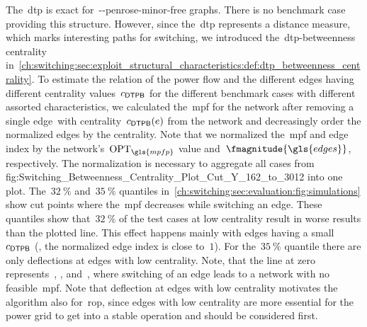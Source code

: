 The~\gls{dtp} is exact for~\source-\sink-penrose-minor-free graphs. There is no
benchmark case providing this structure. However, since the~\gls{dtp} represents
a distance measure, which marks interesting paths for switching, we introduced
the~\gls{dtp}-betweenness centrality
in~\cref{ch:switching:sec:exploit_structural_characteristics:def:dtp_betweenness_centrality}.
To estimate the relation of the power flow and the different edges having
different centrality values~$c_\mathsf{\mathsf{DTP} B}$ for the different benchmark cases with
different assorted characteristics, we calculated the~\gls{mpf} for the network
after removing a single edge~\edge with centrality~$c_\mathsf{\mathsf{DTP} B}(e)$ from the
network and decreasingly order the normalized edges by the centrality. Note that
we normalized the~\gls{mpf} and edge index by the network's~$\opt_{\gls{mpfp}}$
value and~$\fmagnitude{\gls{edges}}$, respectively. The normalization is
necessary to aggregate all cases
from~
{fig:Switching_Betweenness_Centrality_Plot_Cut_Y_162_to_3012} into one plot.
The~$32~\%$ and~$35~\%$ quantiles
in~\cref{ch:switching:sec:evaluation:fig:simulations} show cut points
where the~\gls{mpf} decreases while switching an edge. These quantiles show
that~$32~\%$ of the test cases at low centrality result in worse results than
the plotted line. This effect happens mainly with edges having a small~$c_\mathsf{\mathsf{DTP} B}$
(\ie, the normalized edge index is close to~$1$). For the~$35~\%$ quantile there
are only deflections at edges with low centrality. Note, that the line at zero
represents~, , and~, where
switching of an edge leads to a network with no feasible~\gls{mpf}. Note that
deflection at edges with low centrality motivates the algorithm also
for~\gls{rop}, since edges with low centrality are more essential for the power
grid to get into a stable operation and should be considered first.
%

